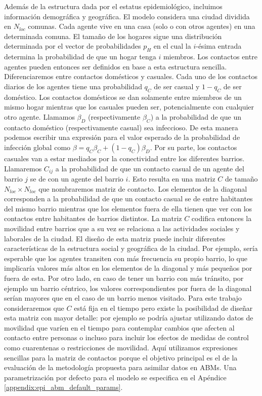 Además de la estructura dada por el estatus epidemiológico, incluimos información demográfica y geográfica. El modelo considera una ciudad dividida en $N_{loc}$ comunas. Cada agente vive en una casa (solo o con otros agentes) en una determinada comuna. El tamaño de los hogares sigue una distribución determinada por el vector de probabilidades $p_H$ en el cual la $i$-ésima entrada determina la probabilidad de que un hogar tenga $i$ miembros. Los contactos entre agentes pueden entonces ser definidos en base a esta estructura sencilla. Diferenciaremos entre contactos domésticos y casuales. Cada uno de los contactos diarios de los agentes tiene una probabilidad $q_C$ de ser casual y $1 - q_C$ de ser doméstico. Los contactos domésticos se dan solamente entre miembros de un mismo hogar mientras que los casuales pueden ser, potencialmente con cualquier otro agente. Llamamos $\beta_D$ (respectivamente $\beta_C$) a la probabilidad de que un contacto doméstico (respectivamente casual) sea infeccioso. De esta manera podemos escribir una expresión para el valor esperado de la probabilidad de infección global como $\beta = q_C \beta_C + (1 - q_C) \beta_D$. Por su parte, los contactos casuales van a estar mediados por la conectividad entre los diferentes barrios. Llamaremos $C_{ij}$ a la probabilidad de que un contacto casual de un agente del barrio $j$ se de con un agente del barrio $i$. Esto resulta en una matriz $C$ de tamaño $N_{loc} \times N_{loc}$ que nombraremos matriz de contacto. Los elementos de la diagonal corresponden a la probabilidad de que un contacto casual se de entre habitantes del mismo barrio mientras que los elementos fuera de ella tienen que ver con los contactos entre habitantes de barrios distintos. La matriz $C$ codifica entonces la movilidad entre barrios que a su vez se relaciona a las actividades sociales y laborales de la ciudad. El diseño de esta matriz puede incluir diferentes características de la estructura social y geográfica de la ciudad. Por ejemplo, sería esperable que los agentes transiten con más frecuencia su propio barrio, lo que implicaría valores más altos en los elementos de la diagonal y más pequeños por fuera de esta. Por otro lado, en caso de tener un barrio con más tránsito, por ejemplo un barrio céntrico, los valores correspondientes por fuera de la diagonal serían mayores que en el caso de un barrio menos visitado. Para este trabajo consideraremos que $C$ está fija en el tiempo pero existe la posibilidad de diseñar esta matriz con mayor detalle: por ejemplo se podría ajustar utilizando datos de movilidad que varíen en el tiempo para contemplar cambios que afecten al contacto entre personas o incluso para incluir los efectos de medidas de control como cuarentenas o restricciones de movilidad. Aquí utilizamos expresiones sencillas para la matriz de contactos porque el objetivo principal es el de la evaluación de la metodología propuesta para asimilar datos en ABMs. Una parametrización por defecto para el modelo se especifica en el Apéndice \ref{appendix:epi_abm_default_params}.

